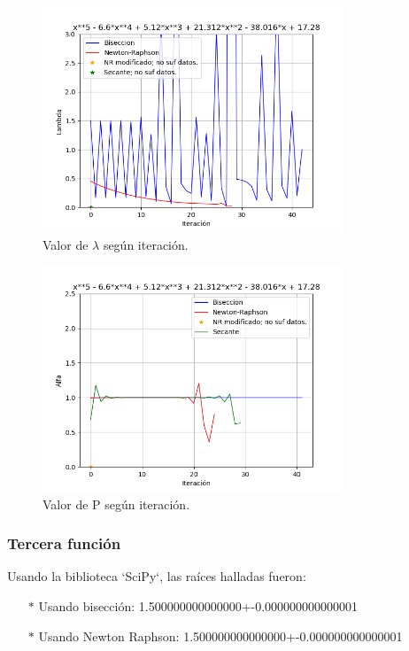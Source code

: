 \documentclass[titlepage,a4paper]{article}
\begin{document}
\begin{figure}[H]
    \centering
    \includegraphics[width=0.8\textwidth]{lambda f2.png}
    \caption{\label{fig:lambdaf2}Valor de $\lambda$ según iteración.}
\end{figure}

\begin{figure}[H]
    \centering
    \includegraphics[width=0.8\textwidth]{alfa f2.png}
    \caption{\label{fig:alfaf2}Valor de P según iteración.}
\end{figure}

\newpage

\subsubsection{Tercera función}\label{sec:CR3}

Usando la biblioteca `SciPy`, las raíces halladas fueron:
\begin{itemize}
    \item[$*$]Usando bisección:   1.500000000000000+-0.000000000000001
    \item[$*$]Usando Newton Raphson:  1.500000000000000+-0.000000000000001
\end{itemize}
\end{document}
